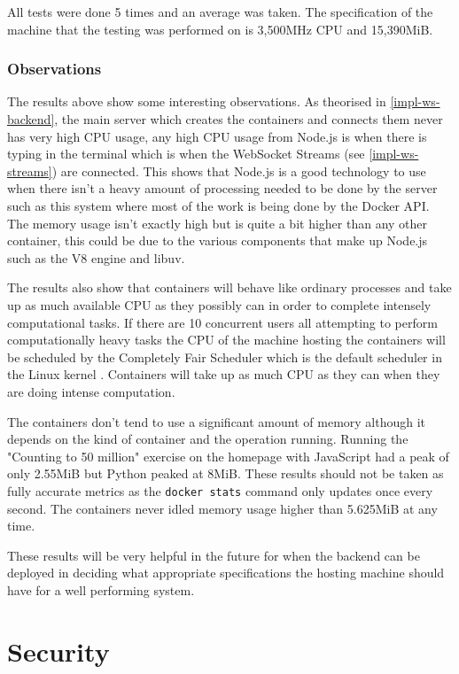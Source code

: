 All tests were done 5 times and an average was taken. The specification of the machine that the testing was performed on is 3,500MHz CPU and 15,390MiB.

\subsubsection{Observations}

The results above show some interesting observations. As theorised in \ref{impl-ws-backend}, the main server which creates the containers and connects them never has very high CPU usage, any high CPU usage from Node.js is when there is typing in the terminal which is when the WebSocket Streams (see \ref{impl-ws-streams}) are connected. This shows that Node.js is a good technology to use when there isn't a heavy amount of processing needed to be done by the server such as this system where most of the work is being done by the Docker API. The memory usage isn't exactly high but is quite a bit higher than any other container, this could be due to the various components that make up Node.js such as the V8 engine and libuv.

The results also show that containers will behave like ordinary processes and take up as much available CPU as they possibly can in order to complete intensely computational tasks. If there are 10 concurrent users all attempting to perform computationally heavy tasks the CPU of the machine hosting the containers will be scheduled by the Completely Fair Scheduler which is the default scheduler in the Linux kernel \cite{cfs-article}.
Containers will take up as much CPU as they can when they are doing intense computation.

The containers don't tend to use a significant amount of memory although it depends on the kind of container and the operation running. Running the "Counting to 50 million" exercise on the homepage with JavaScript had a peak of only 2.55MiB but Python peaked at 8MiB. These results should not be taken as fully accurate metrics as the \texttt{docker stats} command only updates once every second. The containers never idled memory usage higher than 5.625MiB at any time.

These results will be very helpful in the future for when the backend can be deployed in deciding what appropriate specifications the hosting machine should have for a well performing system.

\section{Security} \label{test-sec}

